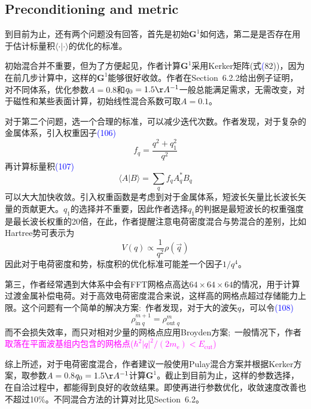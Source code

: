 \documentclass[14pt]{article}      %
\begin{document}
\subsection{Preconditioning and metric}
到目前为止，还有两个问题没有回答，首先是初始$\mathbf{G}^1$如何选，第二是是否存在用于估计标量积$\langle\cdot|\cdot\rangle$的优化的标准。

初始混合并不重要，但为了方便起见，作者计算$\mathbf{G}^1$采用\textrm{Kerker}矩阵(式\textcolor{blue}(82))，因为在前几步计算中，这样的$\mathbf{G}^1$能够很好收敛。作者在\textrm{Section~6.2.2}给出例子证明，对不同体系，优化参数$A=0.8$和$q_0=1.5\AA^{-1}$一般总能满足需求，无需改变，对于磁性和某些表面计算，初始线性混合系数可取$A=0.1$。

对于第二个问题，选一个合理的标准，可以减少迭代次数。作者发现，对于复杂的金属体系，引入权重因子\textcolor{blue}{(106)}
\begin{displaymath}
	f_q=\dfrac{q^2+q_1^2}{q^2}
\end{displaymath}
再计算标量积\textcolor{blue}{(107)}
\begin{displaymath}
	\langle A|B\rangle=\sum_qf_qA_q^{\ast}B_q
\end{displaymath}
可以大大加快收敛。引入权重函数是考虑到对于金属体系，短波长矢量比长波长矢量的贡献更大。$q_1$的选择并不重要，因此作者选择$q_1$的判据是最短波长的权重强度是最长波长权重的20倍，在此，作者提醒注意电荷密度混合与势混合的差别，比如\textrm{Hartree}势可表示为
\begin{displaymath}
	V(q)\propto\dfrac1{q^2}\rho(\vec q)
\end{displaymath}
因此对于电荷密度和势，标度积的优化标准可能差一个因子$1/q^4$。

第三，作者经常遇到大体系中会有\textrm{FFT}网格点高达$64\times64\times64$的情况，用于计算过渡金属补偿电荷。对于高效电荷密度混合来说，这样高的网格点超过存储能力上限。这个问题有一个简单的解决方案:~作者发现，对于大的波矢$q$，可以令\textcolor{blue}{(108)}
\begin{displaymath}
	\rho_{\mathrm{in}\;q}^{m+1}=\rho_{\mathrm{out}\;q}^m
\end{displaymath}
而不会损失效率，而只对相对少量的网格点应用\textrm{Broyden}方案;~一般情况下，作者\textcolor{magenta}{取落在平面波基组内包含的网格点($\hbar^2|q|^2/(2m_{\mathrm{e}})<E_{\mathrm{cut}}$)}

综上所述，对于电荷密度混合，作者建议一般使用\textrm{Pulay}混合方案并根据\textrm{Kerker}方案，取参数$A=0.8$$q_0=1.5\AA^{-1}$计算$\mathbf{G}^1$。截止到目前为止，这样的参数选择，在自洽过程中，都能得到良好的收敛结果。即使再进行参数优化，收敛速度改善也不超过10\%。不同混合方法的计算对比见\textrm{Section~6.2}。
\end{document}
